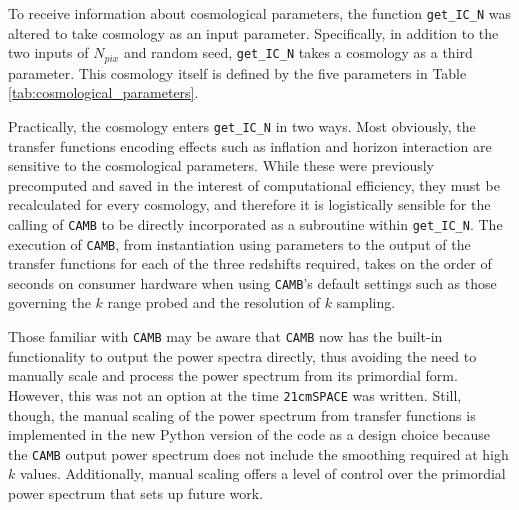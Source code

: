 \documentclass[floats,floatfix,showpacs,amssymb,prd,superscriptaddress,nofootinbib, 11pt]{revtex4-2} %
\newcommand{\code}{\texttt}
\newcommand{\red}{\textcolor{red}}
\begin{document}

To receive information about cosmological parameters, the function \code{get\_IC\_N} was altered to take cosmology as an input parameter. Specifically, in addition to the two inputs of $N_{pix}$ and random seed, \code{get\_IC\_N} takes a cosmology as a third parameter. This cosmology itself is defined by the five parameters in Table \ref{tab:cosmological_parameters}.

Practically, the cosmology enters \code{get\_IC\_N} in two ways. Most obviously, the transfer functions encoding effects such as inflation and horizon interaction are sensitive to the cosmological parameters. While these were previously precomputed and saved in the interest of computational efficiency, they must be recalculated for every cosmology, and therefore it is logistically sensible for the calling of \code{CAMB} to be directly incorporated as a subroutine within \code{get\_IC\_N}. The execution of \code{CAMB}, from instantiation using parameters to the output of the transfer functions for each of the three redshifts required, takes on the order of seconds on consumer hardware when using \code{CAMB}'s default settings such as those governing the $k$ range probed and the resolution of $k$ sampling. %

Those familiar with \code{CAMB} may be aware that \code{CAMB} now has the built-in functionality to output the power spectra directly, thus avoiding the need to manually scale and process the power spectrum from its primordial form. However, this was not an option at the time \code{21cmSPACE} was written. Still, though, the manual scaling of the power spectrum from transfer functions is implemented in the new Python version of the code as a design choice because the \code{CAMB} output power spectrum does not include the smoothing required at high $k$ values. Additionally, manual scaling offers a level of control over the primordial power spectrum that sets up future work.
\end{document}

